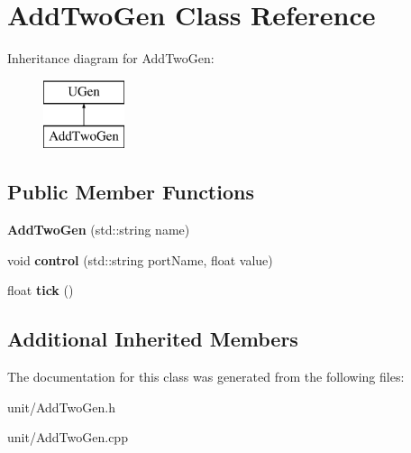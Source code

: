\hypertarget{classAddTwoGen}{}\section{Add\+Two\+Gen Class Reference}
\label{classAddTwoGen}
Inheritance diagram for Add\+Two\+Gen\+:\begin{figure}[H]
\begin{center}
\leavevmode
\includegraphics[height=2.000000cm]{classAddTwoGen}
\end{center}
\end{figure}
\subsection*{Public Member Functions}
\begin{DoxyCompactItemize}
\item 
{\bfseries Add\+Two\+Gen} (std\+::string name)\hypertarget{classAddTwoGen_a6feb4da948f12b37eb4502899b5a4311}{}\label{classAddTwoGen_a6feb4da948f12b37eb4502899b5a4311}

\item 
void {\bfseries control} (std\+::string port\+Name, float value)\hypertarget{classAddTwoGen_a5e0a82722566595b7284386a618ef3cb}{}\label{classAddTwoGen_a5e0a82722566595b7284386a618ef3cb}

\item 
float {\bfseries tick} ()\hypertarget{classAddTwoGen_a8e667f4f6c6849faef9f07a62e779d9a}{}\label{classAddTwoGen_a8e667f4f6c6849faef9f07a62e779d9a}

\end{DoxyCompactItemize}
\subsection*{Additional Inherited Members}


The documentation for this class was generated from the following files\+:\begin{DoxyCompactItemize}
\item 
unit/Add\+Two\+Gen.\+h\item 
unit/Add\+Two\+Gen.\+cpp\end{DoxyCompactItemize}
